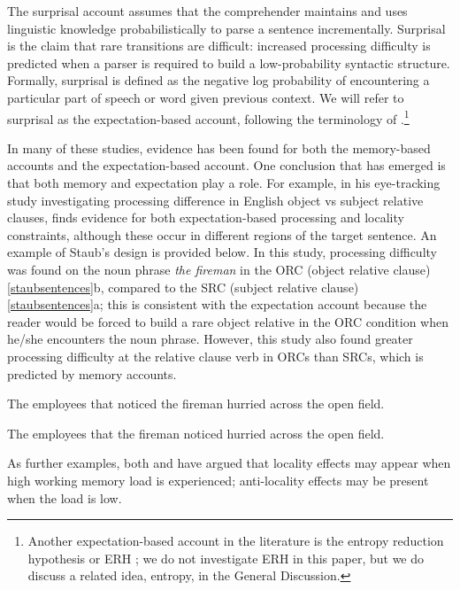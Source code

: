 \documentclass{frontiersSCNS}\usepackage{knitr} %
\begin{document}
The surprisal account assumes that the comprehender maintains and uses linguistic knowledge probabilistically to parse a sentence incrementally.  Surprisal is the claim that rare transitions are difficult: increased processing difficulty is predicted when a parser is required to build a low-probability syntactic structure. Formally, surprisal is defined as the negative log probability of encountering a particular part of speech or word given previous context. We will refer to surprisal as the expectation-based account, following the terminology of  \citet{levy2008expectation}.\footnote{Another expectation-based account in the literature is the entropy reduction hypothesis or ERH \citep{hale06}; we do not investigate ERH in this paper, but we do discuss a related idea, entropy, in the General Discussion.} 

In many of these studies, evidence has been found for both the memory-based accounts and the expectation-based account. One conclusion that has emerged is that both memory and expectation play a role.  For example, in his eye-tracking study investigating processing difference in English object vs subject relative clauses, \cite{staub2010eye} finds evidence for both expectation-based processing and locality constraints, although these occur in different regions of the target sentence.  An example of Staub's design is provided below. In this study, processing difficulty was found on the noun phrase \textit{the fireman} in the ORC (object relative clause) \ref{staubsentences}b, compared to the SRC (subject relative clause) \ref{staubsentences}a; this is consistent with the expectation account because the reader would be forced to build a rare object relative in the ORC condition when he/she encounters the noun phrase. However, this study also found greater processing difficulty at the relative clause verb in ORCs than SRCs, which is predicted by memory accounts. 
 
\begin{exe}
\ex \label{staubsentences}
\begin{xlist}
\item The employees that noticed the fireman hurried across the open field.\\
\item The employees that the fireman noticed hurried across the open field.\\
\end{xlist}
\end{exe}

As further examples, both  \cite{vasishth2011locality} and \cite{levy2013expectation} have argued that locality effects may appear when high working memory load is experienced; anti-locality effects may be present when the load is low.  
\end{document}
